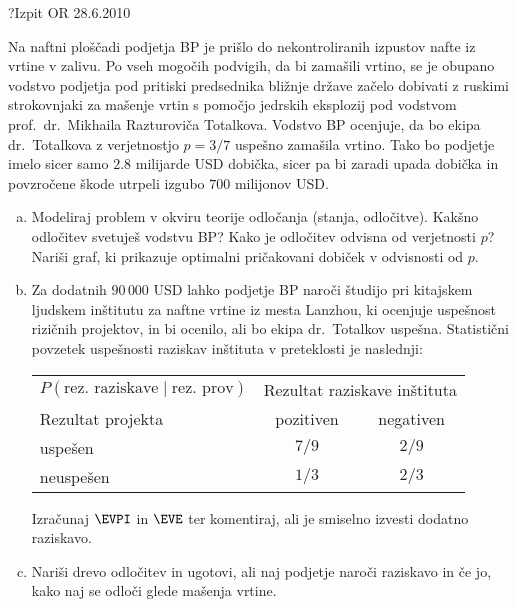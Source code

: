 \begin{naloga}{?}{Izpit OR 28.6.2010}
\begin{vprasanje}
Na naftni ploščadi podjetja BP
je prišlo do nekontroliranih izpustov nafte iz vrtine v zalivu.
Po vseh mogočih podvigih, da bi zamašili vrtino,
se je ob\-upa\-no vodstvo podjetja pod pritiski predsednika bližnje države
začelo dobivati z ruskimi strokovnjaki
za mašenje vrtin s pomočjo jedrskih eksplozij pod vodstvom
prof.~dr.~Mikhaila Razturoviča Totalkova.
Vodstvo BP ocenjuje, da bo ekipa dr.~Totalkova
z verjetnostjo $p = 3/7$ uspešno zamašila vrtino.
Tako bo podjetje imelo sicer samo $2.8$ milijarde USD dobička,
sicer pa bi zaradi upada dobička in povzročene škode
utrpeli izgubo $700$ milijonov USD.

\begin{enumerate}[(a)]
\item Modeliraj problem v okviru teorije odločanja (stanja, odločitve).
Kakšno odločitev svetuješ vodstvu BP?
Kako je odločitev odvisna od verjetnosti $p$?
Nariši graf, ki prikazuje optimalni pričakovani dobiček v odvisnosti od $p$.

\item Za dodatnih $90\,000$ USD lahko podjetje BP naroči študijo
pri kitajskem ljudskem inštitutu za naftne vrtine iz mesta Lanzhou,
ki ocenjuje uspešnost rizičnih projektov,
in bi ocenilo, ali bo ekipa dr.~Totalkov uspešna.
Statistični povzetek uspešnosti raziskav inštituta v preteklosti je naslednji:
\begin{center}
\begin{tabular}{l|cc}
$P(\text{rez.~raziskave} \;|\; \text{rez.~prov})$ &
\multicolumn{2}{c}{Rezultat raziskave inštituta} \\
Rezultat projekta & pozitiven & negativen \\ \hline
uspešen   &  $7/9$ & $2/9$ \\
neuspešen &  $1/3$ & $2/3$
\end{tabular}
\end{center}
Izračunaj $\EVPI$ in $\EVE$ ter komentiraj,
ali je smiselno izvesti dodatno raz\-iska\-vo.

\item Nariši drevo odločitev in ugotovi,
ali naj podjetje naroči raziskavo in če jo,
kako naj se odloči glede mašenja vrtine.
\end{enumerate}
\end{vprasanje}
\begin{odgovor}
\end{odgovor}
\end{naloga}
